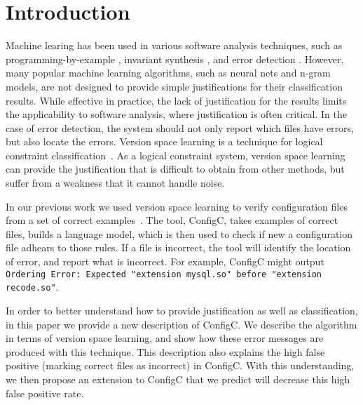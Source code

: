 \section{Introduction}

Machine learing has been used in various software analysis techniques, such as programming-by-example \cite{lau2000version}, invariant synthesis \cite{garg2014ice}, and error detection \cite{Santolucito2016}.
However, many popular machine learning algorithms, such as neural nets and n-gram models, are not designed to provide simple justifications for their classification results.
While effective in practice, the lack of justification for the results limits the applicability to software analysis, where justification is often critical.
In the case of error detection, the system should not only report which files have errors, but also locate the errors.
Version space learning is a technique for logical constraint classification~\cite{mitchell82}.
As a logical constraint system, version space learning can provide the justification that is difficult to obtain from other methods, but suffer from a weakness that it cannot handle noise.


In our previous work we used version space learning to verify configuration files from a set of correct examples~\cite{Santolucito2016}.
The tool, ConfigC, takes examples of correct files, builds a language model, which is then used to check if new a configuration file adhears to those rules.
If a file is incorrect, the tool will identify the location of error, and report what is incorrect.
For example, ConfigC might output \texttt{Ordering Error: Expected "extension mysql.so" before "extension recode.so"}.

In order to better understand how to provide justification as well as classification, in this paper we provide a new description of ConfigC.
We describe the algorithm in terms of version space learning, and show how these error messages are produced with this technique.
This description also explains the high false positive (marking correct files as incorrect) in ConfigC.
With this understanding, we then propose an extension to ConfigC that we predict will decrease this high false positive rate.

